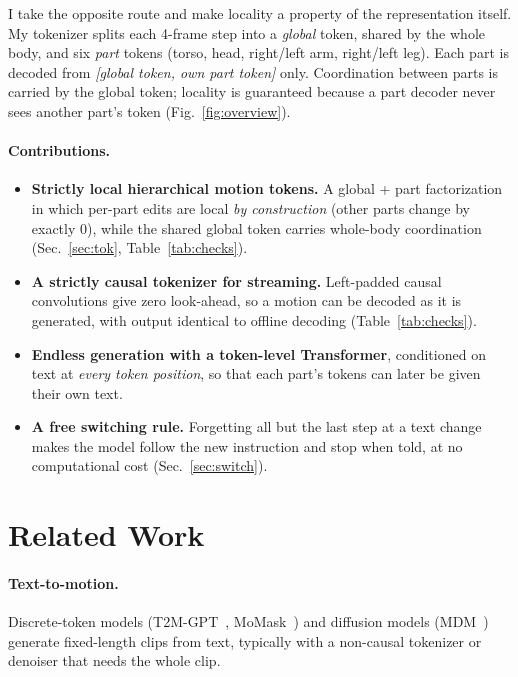 \documentclass[11pt]{article}
\begin{document}
I take the opposite route and make locality a property of the representation itself.
My tokenizer splits each 4-frame step into a \emph{global} token, shared by the whole body, and six
\emph{part} tokens (torso, head, right/left arm, right/left leg).
Each part is decoded from \emph{[global token, own part token]} only.
Coordination between parts is carried by the global token; locality is guaranteed because a part
decoder never sees another part's token (Fig.~\ref{fig:overview}).

\paragraph{Contributions.}
\begin{itemize}
\item \textbf{Strictly local hierarchical motion tokens.}
A global + part factorization in which per-part edits are local \emph{by construction}
(other parts change by exactly $0$), while the shared global token carries whole-body coordination
(Sec.~\ref{sec:tok}, Table~\ref{tab:checks}).
\item \textbf{A strictly causal tokenizer for streaming.}
Left-padded causal convolutions give zero look-ahead, so a motion can be decoded as it is generated,
with output identical to offline decoding (Table~\ref{tab:checks}).
\item \textbf{Endless generation with a token-level Transformer}, conditioned on text at
\emph{every token position}, so that each part's tokens can later be given their own text.
\item \textbf{A free switching rule.}
Forgetting all but the last step at a text change makes the model follow the new instruction and stop
when told, at no computational cost (Sec.~\ref{sec:switch}).
\end{itemize}

\section{Related Work}

\paragraph{Text-to-motion.}
Discrete-token models (T2M-GPT~\cite{t2mgpt}, MoMask~\cite{momask}) and diffusion models
(MDM~\cite{mdm}) generate fixed-length clips from text, typically with a non-causal tokenizer or
denoiser that needs the whole clip.
\end{document}
